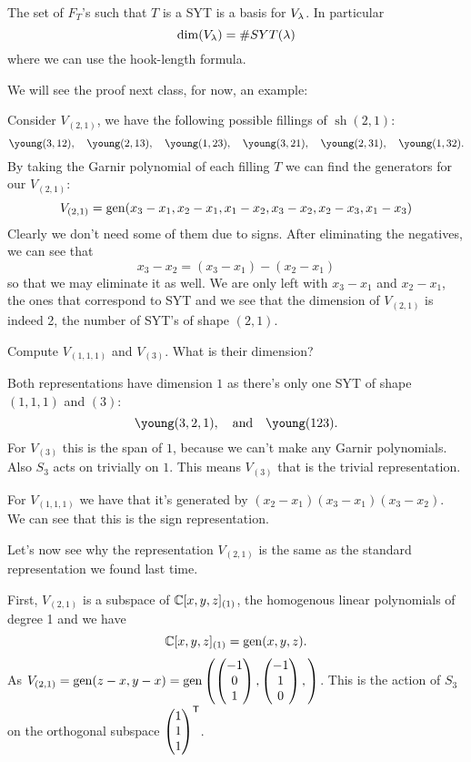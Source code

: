 \documentclass[12pt]{memoir}
\DeclareMathOperator{\sh}{sh}
\begin{document}
\begin{Prop}
    The set of $F_T$'s such that $T$ is a SYT is a basis for $V_\lambda$. In particular 
    $$\dim(V_\lambda)=\# SYT(\lambda)$$
    where we can use the hook-length formula. 
\end{Prop}

We will see the proof next class, for now, an example:

\begin{Ex}
    Consider $V_{(2,1)}$, we have the following possible fillings of $\sh(2,1)$:
    $$\young(3,12),\quad\young(2,13),\quad\young(1,23),\quad\young(3,21),\quad\young(2,31),\quad\young(1,32).$$
    By taking the Garnir polynomial of each filling $T$ we can find the generators for our $V_{(2,1)}$:
    $$V_{(2,1)}=\operatorname{gen}(x_3-x_1,x_2-x_1,x_1-x_2,x_3-x_2,x_2-x_3,x_1-x_3)$$
    Clearly we don't need some of them due to signs. After eliminating the negatives, we can see that 
    $$x_3-x_2=(x_3-x_1)-(x_2-x_1)$$
    so that we may eliminate it as well. We are only left with $x_3-x_1$ and $x_2-x_1$, the ones that correspond to SYT and we see that the dimension of $V_{(2,1)}$ is indeed 2, the number of SYT's of shape $(2,1)$.
\end{Ex}

\begin{Ej}
    Compute $V_{(1,1,1)}$ and $V_{(3)}$. What is their dimension? 
\end{Ej}

\begin{ptcbr}
    Both representations have dimension $1$ as there's only one SYT of shape $(1,1,1)$ and $(3)$:
    $$\young(3,2,1),\word{and}\young(123).$$ 
    For $V_{(3)}$ this is the span of $1$, because we can't make any Garnir polynomials. Also $S_3$ acts on trivially on $1$. This means $V_{(3)}$ that is the trivial representation.\par 
    For $V_{(1,1,1)}$ we have that it's generated by $(x_2-x_1)(x_3-x_1)(x_3-x_2)$. We can see that this is the sign representation.
\end{ptcbr}

Let's now see why the representation $V_{(2,1)}$ is the same as the standard representation we found last time.\par 
First, $V_{(2,1)}$ is a subspace of $\mathbb{C}[x,y,z]_{(1)}$, the homogenous linear polynomials of degree 1 and we have
$$\mathbb{C}[x,y,z]_{(1)}=\operatorname{gen}(x,y,z).$$
As $V_{(2,1)}=\operatorname{gen}(z-x,y-x)=\operatorname{gen}\left(\begin{pmatrix} -1 \\ 0 \\ 1 \end{pmatrix},\begin{pmatrix} -1 \\ 1 \\ 0 \end{pmatrix},\right)$. This is the action of $S_3$ on the orthogonal subspace $\begin{pmatrix} 1 \\ 1 \\ 1 \end{pmatrix}^{\mathsf{T}}$.
\end{document}
